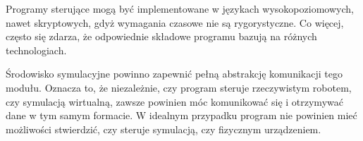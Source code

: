 		Programy sterujące mogą być implementowane w językach wysokopoziomowych, nawet skryptowych, gdyż wymagania czasowe nie są rygorystyczne.
		Co więcej, często się zdarza, że odpowiednie składowe programu bazują na różnych technologiach.

		Środowisko symulacyjne powinno zapewnić pełną abstrakcję komunikacji tego modułu.
		Oznacza to, że niezależnie, czy program steruje rzeczywistym robotem, czy symulacją wirtualną, zawsze powinien móc komunikować się i otrzymywać dane w tym samym formacie.
		W idealnym przypadku program nie powinien mieć możliwości stwierdzić, czy steruje symulacją, czy fizycznym urządzeniem.
		
